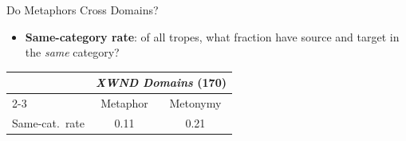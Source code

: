 \documentclass[xetex]{beamer}
\begin{document}



\begin{frame}{Do Metaphors Cross Domains?}


\medskip
\begin{itemize}
  \item \textbf{Same-category rate}: of all tropes, what fraction have source and target in the \emph{same} category?
\\        
\end{itemize}

\begin{center}
\begin{tabular}{lcc}
\toprule
& \multicolumn{2}{c}{\textit{XWND Domains} (170)} \\
\cmidrule(lr){2-3}
& {\color{metaBlue}Metaphor} & {\color{metoRed}Metonymy} \\
\midrule
Same-cat.\ rate    & 0.11 & 0.21 \\
\bottomrule
\end{tabular}
\end{center}



\end{frame}
\end{document}
